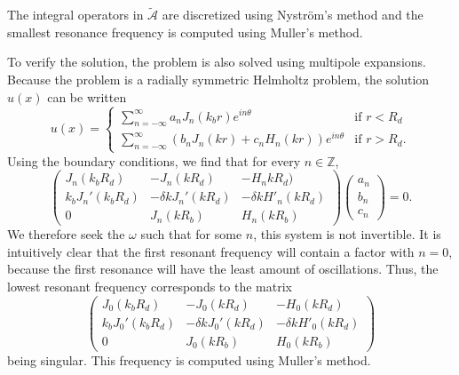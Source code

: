 \documentclass[a4paper]{article}
\theoremstyle{definition}
\newcommand{\Z}{\mathbb{Z}}
\begin{document}
The integral operators in $\tilde{\mathcal{A}}$ are discretized using Nyström's method and the smallest resonance frequency is computed using Muller's method. \cite{first}

To verify the solution, the problem is also solved using multipole expansions. Because the problem is a radially symmetric Helmholtz problem, the solution $u(x)$ can be written
\begin{equation*}
u(x) = \begin{cases}
\sum_{n=-\infty}^\infty a_n J_n(k_br)e^{in\theta} \quad &\text{if } r<R_d \\
\sum_{n=-\infty}^\infty \left(b_n J_n(kr) + c_n H_n(kr)\right) e^{in\theta}  &\text{if } r>R_d.
\end{cases}
\end{equation*}
Using the boundary conditions, we find that for every $n\in \Z$,
\begin{equation*} 
\begin{pmatrix}
J_n(k_bR_d) &  -J_n(kR_d) & -H_nkR_d) \\
k_bJ_n'(k_bR_d) & -\delta kJ_n'(kR_d) & -\delta k H'_n(kR_d)\\
0 & J_n(kR_b) & H_n(kR_b)
\end{pmatrix}
\begin{pmatrix}
a_n \\ b_n \\ c_n
\end{pmatrix} = 0.
\end{equation*}
We therefore seek the $\omega$ such that for some $n$, this system is not invertible. It is intuitively clear that the first resonant frequency will contain a factor with $n=0$, because the first resonance will have the least amount of oscillations. Thus, the lowest resonant frequency corresponds to the matrix
\begin{equation*} 
\begin{pmatrix}
J_0(k_bR_d) &  -J_0(kR_d) & -H_0(kR_d) \\
k_bJ_0'(k_bR_d) & -\delta kJ_0'(kR_d) & -\delta k H'_0(kR_d)\\
0 & J_0(kR_b) & H_0(kR_b)
\end{pmatrix}
\end{equation*}
being singular. This frequency is computed using Muller's method.
\end{document}
